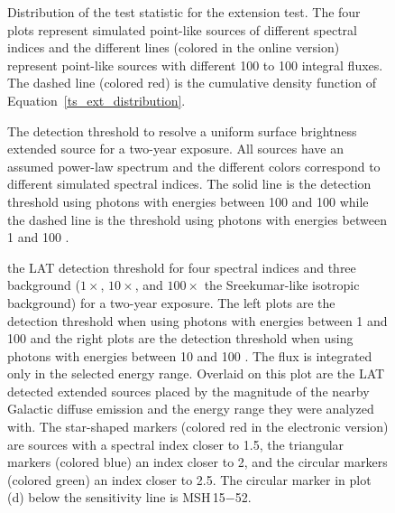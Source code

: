 \documentclass[12pt,preprint]{aastex}
\newif\ifcolorfigure
\newcommand{\mev}{\text{MeV}\xspace}
\newcommand{\gev}{\text{GeV}\xspace}
\begin{document}
\clearpage
\begin{figure}
    \ifcolorfigure
    \plotone{mc_plots/ts_ext_emin_1000_color.eps}
    \else
    \fi
    \caption{
    Distribution of the test statistic for the extension test.
    The four plots
    represent simulated point-like sources of different spectral indices and
    the different lines (colored in the online version) 
    represent point-like sources with different 100 \mev
    to 100 \gev integral fluxes.  The dashed line (colored red)
    is the cumulative
    density function of Equation~\ref{ts_ext_distribution}.
    }\label{ts_ext_mc}
  \end{figure}

\clearpage

\begin{figure}
    \ifcolorfigure
    \plotone{mc_plots/index_sensitivity_color.eps}
    \else
    \fi
    \caption{
    The detection threshold to resolve a
    uniform surface brightness extended source for a two-year exposure.  All sources
    have an assumed power-law spectrum and the different colors correspond
    to different simulated spectral indices.  The solid line is the
    detection threshold using photons with energies between 100 \mev and 100
    \gev while the dashed line is the threshold using 
     photons with energies between 1 \gev and 100 \gev.
    }\label{index_sensitivity}
  \end{figure}

\clearpage
\begin{figure}
    \ifcolorfigure
    \plotone{mc_plots/all_sensitivity_color.eps}
    \else
    \fi
    \caption{the LAT detection threshold for four spectral indices
    and three background ($1\times$, $10\times$, and $100\times$ the
    Sreekumar-like isotropic background) for a two-year exposure. The
    left plots are the detection threshold when using 
    photons with energies between
    1 \gev and 100 \gev
    and the right plots are the detection threshold when using
    photons with energies between
    10 \gev and 100 \gev.  The flux is integrated only in the
    selected energy range.  Overlaid on this plot are the LAT detected
    extended sources placed by the magnitude of the nearby Galactic
    diffuse emission and the energy range they were analyzed with.
    The star-shaped markers (colored red in the electronic version)
    are sources with a spectral index closer to 1.5, the triangular
    markers (colored blue) an index closer to 2, and the circular markers
    (colored green) an index closer to 2.5.  The circular marker in plot
    (d) below the sensitivity line is MSH\,15$-$52.
    }\label{all_sensitivity} 
  \end{figure}
\end{document}
